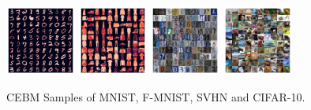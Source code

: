 \documentclass[tablecaption=bottom,wcp]{jmlr} %
\begin{document}
\begin{figure}[!t]
\centering
\includegraphics[width=0.205\textwidth]{figures/mnist_cebm_buffer_samples.pdf}
\includegraphics[width=0.205\textwidth]{figures/fmnist_cebm_samples.pdf}
\includegraphics[width=0.205\textwidth]{figures/svhn_cebm_buffer_samples3.pdf}
\includegraphics[width=0.205\textwidth]{figures/cifar10_cebm_buffer_samples.pdf}
\vspace*{-1.5ex}
\caption{CEBM Samples of MNIST, F-MNIST, SVHN and CIFAR-10.}
\label{fig:generated-samples}
\end{figure}

\end{document}
